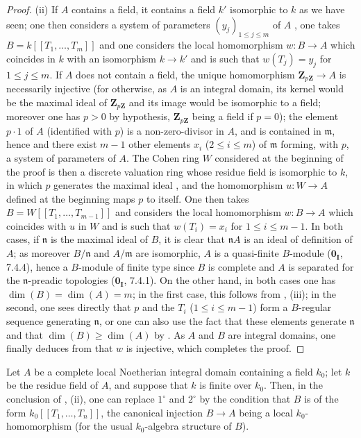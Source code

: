 \begin{proof}
\medskip
\noindent(ii)\enspace
If $A$ contains a field, it contains a field $k'$ isomorphic to $k$ as we have seen; one then considers a system of parameters $(y_j)_{1\leq j\leq m}$ of $A$ , one takes $B=k[[T_1,\ldots,T_m]]$ and one considers the local homomorphism $w:B\to A$ which coincides in $k$ with an isomorphism $k\to k'$ and is such that $w(T_j)=y_j$ for $1\leq j\leq m$.
If $A$ does not contain a field, the unique homomorphism $\mathbf{Z}_{p\mathbf{Z}}\to A$  is necessarily injective (for otherwise, as $A$ is an integral domain, its kernel would be the maximal ideal of $\mathbf{Z}_{p\mathbf{Z}}$ and its image would be isomorphic to a field; moreover one has $p>0$ by hypothesis, $\mathbf{Z}_{p\mathbf{Z}}$ being a field if $p=0$); the element $p\cdot 1$ of $A$ (identified with $p$) is a non-zero-divisor in $A$, and is contained in $\mathfrak{m}$, hence  and  there exist $m-1$ other elements $x_i$ ($2\leq i\leq m$) of $\mathfrak{m}$ forming, with $p$, a system of parameters of $A$.
The Cohen ring $W$ considered at the beginning of the proof is then a discrete valuation ring whose residue field is isomorphic to $k$, in which $p$ generates the maximal ideal , and the homomorphism $u:W\to A$ defined at the beginning maps $p$ to itself.
One then takes $B=W[[T_1,\ldots,T_{m-1}]]$ and considers the local homomorphism $w:B\to A$ which coincides with $u$ in $W$ and is such that $w(T_i)=x_i$ for $1\leq i\leq m-1$.
In both cases, if $\mathfrak{n}$ is the maximal ideal of $B$, it is clear that $\mathfrak{n}A$ is an ideal of definition of $A$; as moreover $B/\mathfrak{n}$ and $A/\mathfrak{m}$ are isomorphic, $A$ is a quasi-finite $B$-module ($\mathbf{0_I}$, 7.4.4), hence a $B$-module of finite type since $B$ is complete and $A$ is separated for the $\mathfrak{n}$-preadic topologies ($\mathbf{0_I}$, 7.4.1).
On the other hand, in both cases one has $\dim(B)=\dim(A)=m$; in the first case, this follows from , (iii); in the second, one sees directly that $p$ and the $T_i$ ($1\leq i\leq m-1$) form a $B$-regular sequence generating $\mathfrak{n}$, or one can also use the fact that these elements generate $\mathfrak{n}$ and that $\dim(B)\geq\dim(A)$ by .
As $A$ and $B$ are integral domains, one finally deduces from  that $w$ is injective, which completes the proof.
\end{proof}

\begin{corollary}[19.8.9]
\label{0.19.8.9}
Let $A$ be a complete local Noetherian integral domain containing a field $k_0$; let $k$ be the residue field of $A$, and suppose that $k$ is finite over $k_0$.
Then, in the conclusion of , (ii), one can replace $1^\circ$ and $2^\circ$ by the condition that $B$ is of the form $k_0[[T_1,\ldots,T_n]]$, the canonical injection $B\to A$ being a local $k_0$-homomorphism (for the usual $k_0$-algebra structure of $B$).
\end{corollary}

